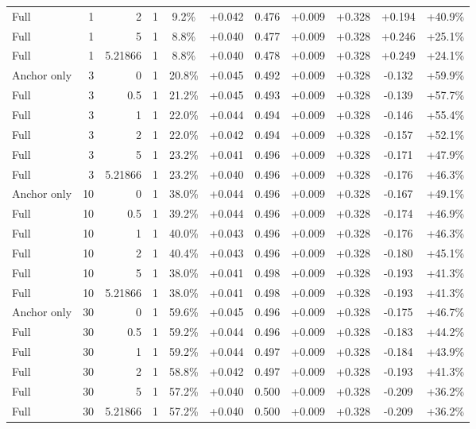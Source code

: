 \begin{table}[htbp]
\begin{tabular}{lrrrccccccc}
Full & 1 & 2 & 1 & 9.2\% & +0.042 & 0.476 & +0.009 & +0.328 & +0.194 & +40.9\% \\
Full & 1 & 5 & 1 & 8.8\% & +0.040 & 0.477 & +0.009 & +0.328 & +0.246 & +25.1\% \\
Full & 1 & 5.21866 & 1 & 8.8\% & +0.040 & 0.478 & +0.009 & +0.328 & +0.249 & +24.1\% \\
Anchor only & 3 & 0 & 1 & 20.8\% & +0.045 & 0.492 & +0.009 & +0.328 & -0.132 & +59.9\% \\
Full & 3 & 0.5 & 1 & 21.2\% & +0.045 & 0.493 & +0.009 & +0.328 & -0.139 & +57.7\% \\
Full & 3 & 1 & 1 & 22.0\% & +0.044 & 0.494 & +0.009 & +0.328 & -0.146 & +55.4\% \\
Full & 3 & 2 & 1 & 22.0\% & +0.042 & 0.494 & +0.009 & +0.328 & -0.157 & +52.1\% \\
Full & 3 & 5 & 1 & 23.2\% & +0.041 & 0.496 & +0.009 & +0.328 & -0.171 & +47.9\% \\
Full & 3 & 5.21866 & 1 & 23.2\% & +0.040 & 0.496 & +0.009 & +0.328 & -0.176 & +46.3\% \\
Anchor only & 10 & 0 & 1 & 38.0\% & +0.044 & 0.496 & +0.009 & +0.328 & -0.167 & +49.1\% \\
Full & 10 & 0.5 & 1 & 39.2\% & +0.044 & 0.496 & +0.009 & +0.328 & -0.174 & +46.9\% \\
Full & 10 & 1 & 1 & 40.0\% & +0.043 & 0.496 & +0.009 & +0.328 & -0.176 & +46.3\% \\
Full & 10 & 2 & 1 & 40.4\% & +0.043 & 0.496 & +0.009 & +0.328 & -0.180 & +45.1\% \\
Full & 10 & 5 & 1 & 38.0\% & +0.041 & 0.498 & +0.009 & +0.328 & -0.193 & +41.3\% \\
Full & 10 & 5.21866 & 1 & 38.0\% & +0.041 & 0.498 & +0.009 & +0.328 & -0.193 & +41.3\% \\
Anchor only & 30 & 0 & 1 & 59.6\% & +0.045 & 0.496 & +0.009 & +0.328 & -0.175 & +46.7\% \\
Full & 30 & 0.5 & 1 & 59.2\% & +0.044 & 0.496 & +0.009 & +0.328 & -0.183 & +44.2\% \\
Full & 30 & 1 & 1 & 59.2\% & +0.044 & 0.497 & +0.009 & +0.328 & -0.184 & +43.9\% \\
Full & 30 & 2 & 1 & 58.8\% & +0.042 & 0.497 & +0.009 & +0.328 & -0.193 & +41.3\% \\
Full & 30 & 5 & 1 & 57.2\% & +0.040 & 0.500 & +0.009 & +0.328 & -0.209 & +36.2\% \\
Full & 30 & 5.21866 & 1 & 57.2\% & +0.040 & 0.500 & +0.009 & +0.328 & -0.209 & +36.2\% \\

\end{tabular}
\end{table}

